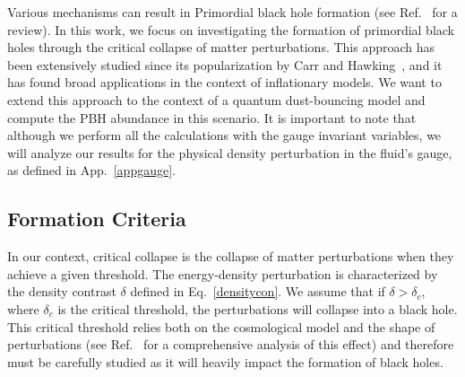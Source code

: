 \documentclass[a4paper,11pt]{article}
\begin{document}
Various mechanisms can result in Primordial black hole formation (see
Ref.~\cite{Escriva2023} for a review). In this work, we focus on investigating the
formation of primordial black holes through the critical collapse of matter
perturbations. This approach has been extensively studied since its popularization by
Carr and Hawking~\cite{Hawking1971, Carr1974}, and it has found broad applications in
the context of inflationary models. We want to extend this approach to the context of a
quantum dust-bouncing model and compute the PBH abundance in this scenario. It is
important to note that although we perform all the calculations with the gauge invariant
variables, we will analyze our results for the physical density perturbation in the
fluid's gauge, as defined in App.~\ref{appgauge}.

\subsection{Formation Criteria}

In our context, critical collapse is the collapse of matter perturbations when they
achieve a given threshold. The energy-density perturbation is characterized by the
density contrast $\delta$ defined in Eq.~\eqref{densitycon}. We assume that if $\delta >
	\delta_c$, where $\delta_c$ is the critical threshold, the perturbations will collapse
into a black hole. This critical threshold relies both on the cosmological model and the
shape of perturbations (see Ref.~\cite{Niemeyer1998, Musco2019} for a comprehensive
analysis of this effect) and therefore must be carefully studied as it will heavily
impact the formation of black holes.
\end{document}
